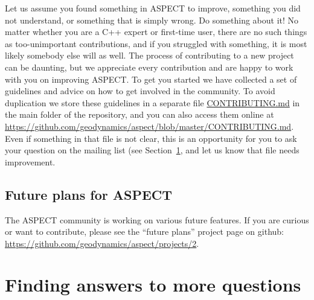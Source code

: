 \documentclass{article}
\newcommand{\aspect}{\textsc{ASPECT}}
\begin{document}
Let us assume you found something in \aspect{} to improve, something you did not
understand, or something that is simply wrong. Do something about it! No matter
whether you are a C++ expert or first-time user, there are no such things as too-unimportant
contributions, and if you struggled with something, it is most likely somebody else will
as well. The process of contributing to a new project can be daunting, but we appreciate
every contribution and are happy to work with you on improving \aspect{}. To get
you started we have collected a set of guidelines and advice on how to get involved in the
community. To avoid duplication we store these guidelines in a separate file \url{CONTRIBUTING.md}
in the main folder of the repository, and you can also access them online at \url{https://github.com/geodynamics/aspect/blob/master/CONTRIBUTING.md}. Even if something in that file is not clear, this
is an opportunity for you to ask your question on the mailing list (see 
Section~\ref{sec:questions-and-answers}, and let us know that file needs improvement.

\subsection{Future plans for \aspect}
\label{sec:future}

The \aspect{} community is working on various future features. If you are
curious or want to contribute, please see the ``future plans'' project page on
github: \url{https://github.com/geodynamics/aspect/projects/2}.


\section{Finding answers to more questions}
\label{sec:questions-and-answers}
\end{document}

